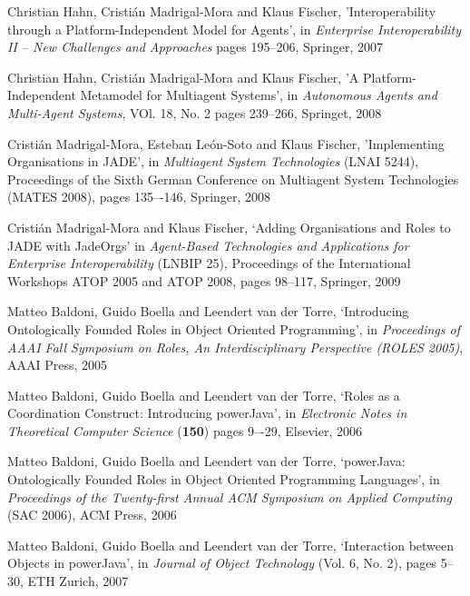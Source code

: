 \begin{thebibliography}{99}
Christian Hahn, Cristián Madrigal-Mora and Klaus Fischer,
'Interoperability through a Platform-Independent Model for Agents',
in \textit{Enterprise Interoperability II -- New Challenges and Approaches}
pages 195--206,
Springer, 2007

Christian Hahn, Cristián Madrigal-Mora and Klaus Fischer,
'A Platform-Independent Metamodel for Multiagent Systems',
in \textit{Autonomous Agents and Multi-Agent Systems}, VOl. 18, No. 2
pages 239--266,
Springet, 2008

Cristián Madrigal-Mora, Esteban León-Soto and Klaus Fischer,
'Implementing Organisations in JADE',
in \textit{Multiagent System Technologies} (LNAI 5244),
Proceedings of the Sixth German Conference on Multiagent System Technologies (MATES 2008),
pages 135–-146,
Springer, 2008

Cristián Madrigal-Mora and Klaus Fischer,
`Adding Organisations and Roles to JADE with JadeOrgs'
in \textit{Agent-Based Technologies and Applications for Enterprise Interoperability} (LNBIP 25),
Proceedings of the International Workshops ATOP 2005 and ATOP 2008,
pages 98--117,
Springer, 2009


Matteo Baldoni, Guido Boella and Leendert van der Torre,
`Introducing Ontologically Founded Roles in Object Oriented Programming',
in \textit{Proceedings of AAAI Fall Symposium on Roles, An Interdisciplinary Perspective (ROLES 2005)},
AAAI Press, 2005

Matteo Baldoni, Guido Boella and Leendert van der Torre,
`Roles as a Coordination Construct: Introducing powerJava',
in \textit{Electronic Notes in Theoretical Computer Science} (\textbf{150})
pages 9–-29,
Elsevier, 2006

Matteo Baldoni, Guido Boella and Leendert van der Torre,
`powerJava: Ontologically Founded Roles in Object Oriented Programming Languages',
in \textit{Proceedings of the Twenty-first Annual ACM Symposium on Applied Computing} (SAC 2006),
ACM Press, 2006

Matteo Baldoni, Guido Boella and Leendert van der Torre,
`Interaction between Objects in powerJava',
in \textit{Journal of Object Technology} (Vol. 6, No. 2),
pages 5--30,
ETH Zurich, 2007


\end{thebibliography}

